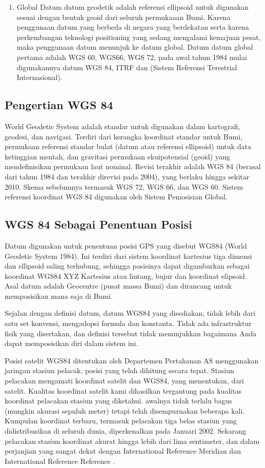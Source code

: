 \begin{enumerate}
\item Global Datum datum geodetik adalah referensi ellipsoid untuk digunakan sesuai dengan bentuk geoid dari seluruh permukaaan Bumi. Karena penggunaan datum yang berbeda di negara yang berdekatan serta karena perkembangan teknologi positioning yang sedang mengalami kemajuan pesat, maka penggunaan datum menunjuk ke datum global. Datum datum global pertama adalah WGS 60, WGS66, WGS 72, pada awal tahun 1984 mulai digunakannya datum WGS 84, ITRF dan (Sistem Referensi Terestrial Internasional).
\end{enumerate}

\subsection{Pengertian WGS 84}
World Geodetic System adalah standar untuk digunakan dalam kartografi, geodesi, dan navigasi. Terdiri dari kerangka koordinat standar untuk Bumi, permukaan referensi standar bulat (datum atau referensi ellipsoid) untuk data ketinggian mentah, dan gravitasi permukaan ekuipotensial (geoid) yang mendefinisikan permukaan laut nominal. 
Revisi terakhir adalah WGS 84 (berasal dari tahun 1984 dan terakhir direvisi pada 2004), yang berlaku hingga sekitar 2010. Skema sebelumnya termasuk WGS 72, WGS 66, dan WGS 60. Sistem referensi koordinat WGS 84 digunakan oleh Sistem Pemosisian Global.

\subsection{WGS 84 Sebagai Penentuan Posisi}
Datum digunakan untuk penentuan posisi GPS yang disebut WGS84 (World Geodetic System 1984). Ini terdiri dari sistem koordinat kartesius tiga dimensi dan ellipsoid saling terhubung, sehingga posisinya dapat digambarkan sebagai koordinat WGS84 XYZ Kartesius atau lintang, bujur dan koordinat elipsoid. Asal datum adalah Geocentre (pusat massa Bumi) dan dirancang untuk memposisikan mana saja di Bumi.
 
Sejalan dengan definisi datum, datum WGS84 yang disediakan, tidak lebih dari satu set konvensi, mengadopsi formula dan konstanta. Tidak ada infrastruktur fisik yang disertakan, dan definisi tersebut tidak menunjukkan bagaimana Anda dapat memposisikan diri dalam sistem ini. 

Posisi satelit WGS84 ditentukan oleh Departemen Pertahanan AS menggunakan jaringan stasiun pelacak, posisi yang telah dihitung secara tepat. Stasiun pelacakan mengamati koordinat satelit dan WGS84, yang menentukan, dari satelit. Kualitas koordinat satelit kami dihasilkan tergantung pada kualitas koordinat pelacakan stasiun yang diketahui. awalnya tidak terlalu bagus (mungkin akurasi sepuluh meter) tetapi telah disempurnakan beberapa kali. Kumpulan koordinat terbaru, termasuk pelacakan tiga belas stasiun yang didistribusikan di seluruh dunia, diperkenalkan pada Januari 2002. Sekarang pelacakan stasiun koordinat akurat hingga lebih dari lima sentimeter, dan dalam perjanjian yang sangat dekat dengan International Reference Meridian dan International Reference Reference .

